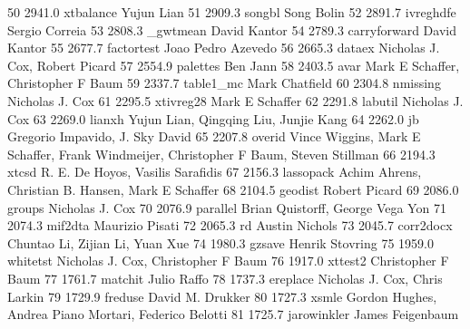    50   2941.0    xtbalance     Yujun Lian                              
    51   2909.3    songbl        Song Bolin                              
    52   2891.7    ivreghdfe     Sergio Correia                          
    53   2808.3    _gwtmean      David Kantor                            
    54   2789.3    carryforward  David Kantor                            
    55   2677.7    factortest    Joao Pedro Azevedo                      
    56   2665.3    dataex        Nicholas J. Cox, Robert Picard          
    57   2554.9    palettes      Ben Jann                                
    58   2403.5    avar          Mark E Schaffer, Christopher F Baum     
    59   2337.7    table1_mc     Mark Chatfield                          
    60   2304.8    nmissing      Nicholas J. Cox                         
    61   2295.5    xtivreg28     Mark E Schaffer                         
    62   2291.8    labutil       Nicholas J. Cox                         
    63   2269.0    lianxh        Yujun Lian, Qingqing Liu, Junjie Kang   
    64   2262.0    jb            Gregorio Impavido, J. Sky David         
    65   2207.8    overid        Vince Wiggins, Mark E Schaffer, Frank   
                                   Windmeijer, Christopher F Baum, Steven  
                                   Stillman                                
    66   2194.3    xtcsd         R. E. De Hoyos, Vasilis Sarafidis       
    67   2156.3    lassopack     Achim Ahrens, Christian B. Hansen, Mark 
                                   E Schaffer                              
    68   2104.5    geodist       Robert Picard                           
    69   2086.0    groups        Nicholas J. Cox                         
    70   2076.9    parallel      Brian Quistorff, George Vega Yon        
    71   2074.3    mif2dta       Maurizio Pisati                         
    72   2065.3    rd            Austin Nichols                          
    73   2045.7    corr2docx     Chuntao Li, Zijian Li, Yuan Xue         
    74   1980.3    gzsave        Henrik Stovring                         
    75   1959.0    whitetst      Nicholas J. Cox, Christopher F Baum     
    76   1917.0    xttest2       Christopher F Baum                      
    77   1761.7    matchit       Julio Raffo                             
    78   1737.3    ereplace      Nicholas J. Cox, Chris Larkin           
    79   1729.9    freduse       David M. Drukker                        
    80   1727.3    xsmle         Gordon Hughes, Andrea Piano Mortari,    
                                   Federico Belotti                        
    81   1725.7    jarowinkler   James Feigenbaum                        
